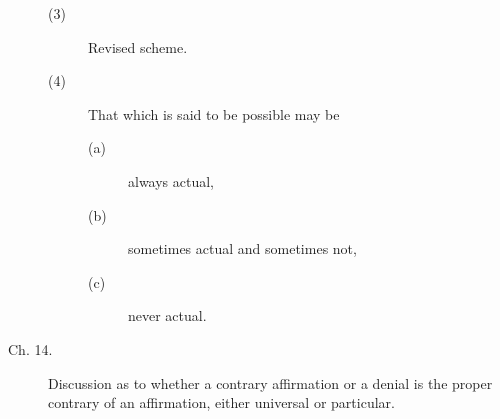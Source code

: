\begin{description}
\begin{description}
\item[(3)] Revised scheme. 

\item[(4)] That which is said to be possible may be

\begin{description}
\item[(a)] always actual, 
\item[(b)] sometimes actual and sometimes not,
\item[(c)] never actual. 
\end{description}

\end{description}

\item[Ch. 14.] Discussion as to whether a contrary affirmation or a denial 
is the proper contrary of an affirmation, either universal or particular. 

\end{description}

\renewcommand{\aref}{\arefC}
